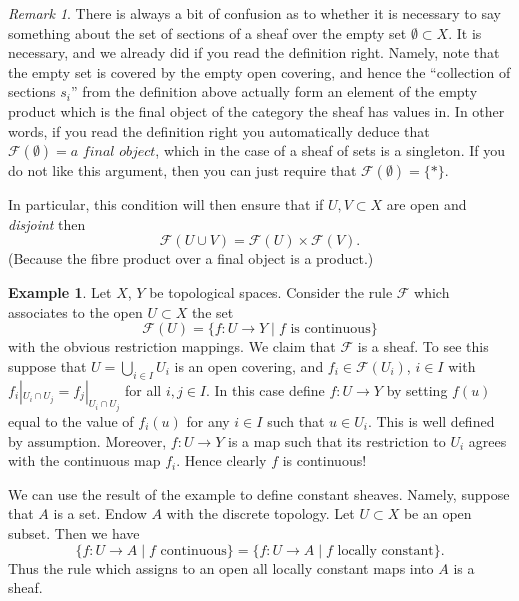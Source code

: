 \documentclass{stacks-project}
\theoremstyle{plain}
\theoremstyle{definition}
\newtheorem{example}[subsection]{Example}
\theoremstyle{remark}
\newtheorem{remark}[subsection]{Remark}
\numberwithin{equation}{subsection}
\begin{document}
\begin{remark}
\label{remark-confusion}
There is always a bit of confusion as to whether it is
necessary to say something about the set of sections of
a sheaf over the empty set $\emptyset \subset X$.
It is necessary, and we already did if you read the
definition right. Namely, note that the empty set is
covered by the empty open covering, and hence the ``collection
of sections $s_i$'' from the definition above actually form
an element of the empty product which is the final object
of the category the sheaf has values in. In other words,
if you read the definition right you automatically deduce
that $\mathcal{F}(\emptyset) = \textit{a final object}$,
which in the case of a sheaf of sets is a singleton.
If you do not like this argument, then you can just require
that $\mathcal{F}(\emptyset) = \{*\}$.

\medskip\noindent
In particular, this condition will then ensure that if
$U, V \subset X$ are open and {\it disjoint} then
$$
\mathcal{F}(U \cup V) = \mathcal{F}(U) \times \mathcal{F}(V).
$$
(Because the fibre product over a final object is a product.)
\end{remark}

\begin{example}
\label{example-basic-continuous-maps}
Let $X$, $Y$ be topological spaces.
Consider the rule $\mathcal{F}$ which associates to
the open $U \subset X$ the set
$$
\mathcal{F}(U) = \{ f : U \to Y \mid f \text{ is continuous}\}
$$
with the obvious restriction mappings. We claim that
$\mathcal{F}$ is a sheaf. To see this suppose that
$U = \bigcup_{i\in I} U_i$ is an open covering, and
$f_i \in \mathcal{F}(U_i)$, $i\in I$ with
$f_i |_{U_i \cap U_j} = f_j|_{U_i \cap U_j}$ for all $i, j \in I$.
In this case define $f : U \to Y$ by setting $f(u)$
equal to the value of $f_i(u)$ for any $i \in I$ such that
$u \in U_i$. This is well defined by assumption. Moreover,
$f : U \to Y$ is a map such that its restriction to $U_i$
agrees with the continuous map $f_i$. Hence clearly $f$ is
continuous!
\end{example}

\noindent
We can use the result of the example to define constant
sheaves. Namely, suppose that $A$ is a set. Endow $A$ with
the discrete topology. Let $U \subset X$ be an open subset.
Then we have
$$
\{ f : U \to A \mid f\text{ continuous}\}
=
\{ f : U \to A \mid f\text{ locally constant}\}.
$$
Thus the rule which assigns to an open all locally
constant maps into $A$ is a sheaf.
\end{document}
